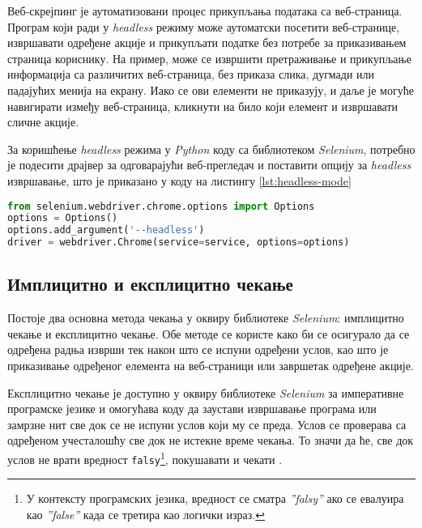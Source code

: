 \documentclass[12pt,oneside]{memoir}
\begin{document}
Веб-скрејпинг је аутоматизовани процес прикупљања података са веб-страница. Програм који ради у \textit{headless} режиму може аутоматски посетити веб-странице, извршавати одређене акције и прикупљати податке без потребе за приказивањем страница кориснику. На пример, може се извршити претраживање и прикупљање информација са различитих веб-страница, без приказа слика, дугмади или падајућих менија на екрану. Иако се ови елементи не приказују, и даље је могуће навигирати између веб-страница, кликнути на било који елемент и извршавати сличне акције.

За коришћење \textit{headless} режима у \textit{Python} коду са библиотеком  \textit{Selenium}, потребно је подесити драјвер за одговарајући веб-прегледач и поставити опцију за \textit{headless} извршавање, што је приказано у коду на листингу \ref{lst:headless-mode} 
\begin{lstlisting}[language=Python, caption={Омогућавање \textit{headless} режима}, label={lst:headless-mode}]
from selenium.webdriver.chrome.options import Options
options = Options()
options.add_argument('--headless')
driver = webdriver.Chrome(service=service, options=options)
\end{lstlisting}

\subsection{Имплицитно и експлицитно чекање}
Постоје два основна метода чекања у оквиру библиотеке \textit{Selenium}: 
имплицитно чекање и експлицитно чекање. Обе методе се користе како би се осигурало да се одређена радња изврши тек након што се испуни одређени услов, као што је приказивање одређеног елемента на веб-страници или завршетак одређене акције.

Експлицитно чекање је доступно у оквиру библиотеке \textit{Selenium} за императивне програмске језике и омогућава коду да заустави извршавање програма или замрзне нит све док се не испуни услов који му се преда. Услов се проверава са одређеном учесталошћу све док не истекне време чекања. То значи да ће, све док услов не врати вредност \texttt{falsy}\footnote{
У контексту програмских језика, вредност се сматра \textit{''falsy''} ако се евалуира као \textit{''false''} када се третира као логички израз.
}, покушавати и чекати \cite{selenium}.
\end{document}
